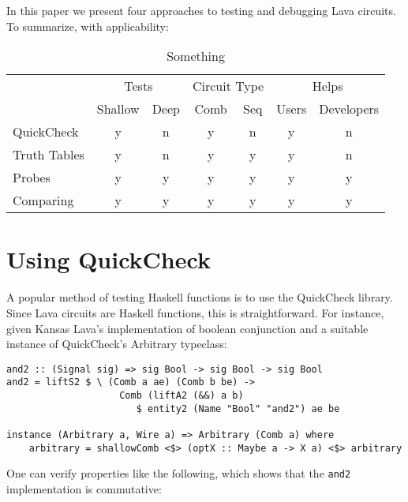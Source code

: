 \documentclass{llncs}
\begin{document}
In this paper we present four approaches to testing and debugging
Lava circuits. To summarize, with applicability:

\begin{table}
\label{table:approaches}

\begin{center}
\begin{tabular}{l | c | c | c | c | c | c |}
\cline{2-7}
& \multicolumn{2}{|c|}{Tests}
& \multicolumn{2}{|c|}{Circuit Type}
& \multicolumn{2}{|c|}{Helps} \\
\cline{2-7}
 & Shallow & Deep & Comb & Seq & Users & Developers \\
\hline
\multicolumn{1}{|l|}{QuickCheck} & y & n & y & n & y & n \\
\hline
\multicolumn{1}{|l|}{Truth Tables} & y & n & y & y & y & n \\
\hline
\multicolumn{1}{|l|}{Probes} & y & y & y & y & y & y \\
\hline
\multicolumn{1}{|l|}{Comparing} & y & y & y & y & y & y \\
\hline
\end{tabular}

\caption{Something}

\end{center}
\end{table}

\section{Using QuickCheck}

A popular method of testing Haskell functions is to use the QuickCheck library.
Since Lava circuits are Haskell functions, this is straightforward.
For instance, given Kansas Lava's implementation of boolean conjunction and
a suitable instance of QuickCheck's Arbitrary typeclass:

\begin{verbatim}
and2 :: (Signal sig) => sig Bool -> sig Bool -> sig Bool
and2 = liftS2 $ \ (Comb a ae) (Comb b be) ->
                    Comb (liftA2 (&&) a b)
                       $ entity2 (Name "Bool" "and2") ae be

instance (Arbitrary a, Wire a) => Arbitrary (Comb a) where
    arbitrary = shallowComb <$> (optX :: Maybe a -> X a) <$> arbitrary
\end{verbatim}

One can verify properties like the following, which shows that the
\verb|and2| implementation is commutative:
\end{document}
